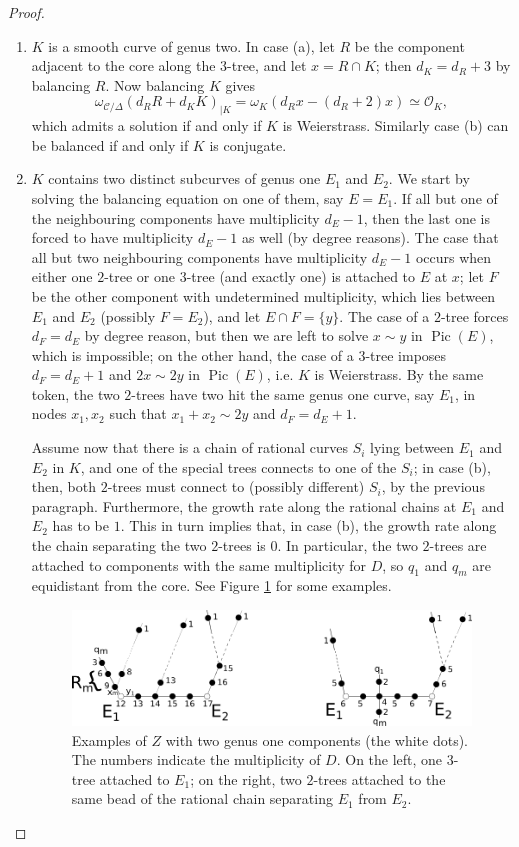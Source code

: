 \documentclass[11pt]{amsart}
\newcommand{\OO}{\mathcal O}
\newcommand{\dvr}{\Delta}
\newcommand{\Pic}{\operatorname{Pic}}
\theoremstyle{plain}
\theoremstyle{definition}
\begin{document}
\begin{proof}
\begin{enumerate}[leftmargin=.6cm]

 \item $K$ is a smooth curve of genus two. In case (a), let $R$ be the component adjacent to the core along the $3$-tree, and let $x=R\cap K$; then $d_K=d_R+3$ by balancing $R$. Now balancing $K$ gives \[\omega_{\mathcal C/\dvr}(d_RR+d_KK)_{|K}=\omega_K(d_Rx-(d_R+2)x)\simeq\OO_K,\]
 which admits a solution if and only if $K$ is Weierstrass. Similarly case (b) can be balanced if and only if $K$ is conjugate.
 
 \item $K$ contains two distinct subcurves of genus one $E_1$ and $E_2$. We start by solving the balancing equation on one of them, say $E=E_1$.
 If all but one of the neighbouring components have multiplicity $d_E-1$, then the last one is forced to have multiplicity $d_E-1$ as well (by degree reasons). The case that all but two neighbouring components have multiplicity $d_E-1$ occurs when either one $2$-tree or one $3$-tree (and exactly one) is attached to $E$ at $x$; let $F$ be the other component with undetermined multiplicity, which lies between $E_1$ and $E_2$ (possibly $F=E_2$), and let $E\cap F=\{y\}$. The case of a $2$-tree forces $d_F=d_E$ by degree reason, but then we are left to solve $x\sim y$ in $\Pic(E)$, which is impossible; on the other hand, the case of a $3$-tree imposes $d_F=d_E+1$ and $2x\sim 2y$ in $\Pic(E)$, i.e. $K$ is Weierstrass. By the same token, the two $2$-trees have two hit the same genus one curve, say $E_1$, in nodes $x_1,x_2$ such that $x_1+x_2\sim 2y$ and $d_F=d_E+1$.
 
 Assume now that there is a chain of rational curves $S_i$ lying between $E_1$ and $E_2$ in $K$, and one of the special trees connects to one of the $S_i$; in case (b), then, both $2$-trees must connect to (possibly different) $S_i$, by the previous paragraph. Furthermore, the growth rate along the rational chains at $E_1$ and $E_2$ has to be $1$. This in turn implies that, in case (b), the growth rate along the chain separating the two $2$-trees is $0$. In particular, the two $2$-trees are attached to components with the same multiplicity for $D$, so $q_1$ and $q_m$ are equidistant from the core. See Figure \ref{fig:E1E2} for some examples.
 
 \begin{figure}
 \includegraphics[width=.8\textwidth]{E1E2example} 
 \caption{Examples of $Z$ with two genus one components (the white dots). The numbers indicate the multiplicity of $D$. On the left, one $3$-tree attached to $E_1$; on the right, two $2$-trees attached to the same bead of the rational chain separating $E_1$ from $E_2$.}\label{fig:E1E2}
  \end{figure}
  

\end{enumerate}
\end{proof}
\end{document}
